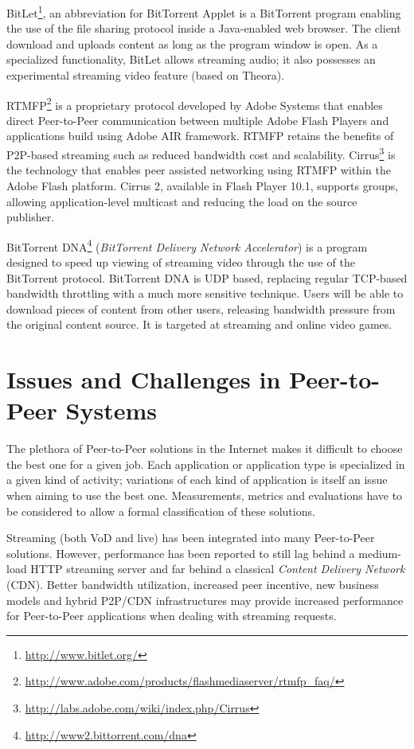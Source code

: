BitLet\footnote{\url{http://www.bitlet.org/}}, an abbreviation for BitTorrent Applet
is a BitTorrent program enabling the use of the file sharing protocol inside a
Java-enabled web browser. The client download and uploads content as long as
the program window is open. As a specialized functionality, BitLet allows
streaming audio; it also possesses an experimental streaming video feature
(based on Theora).

RTMFP\footnote{\url{http://www.adobe.com/products/flashmediaserver/rtmfp_faq/}} is a
proprietary protocol developed by Adobe Systems that enables direct
Peer-to-Peer communication between multiple Adobe Flash Players and
applications build using Adobe AIR framework. RTMFP retains the benefits of
P2P-based streaming such as reduced bandwidth cost and scalability.
Cirrus\footnote{\url{http://labs.adobe.com/wiki/index.php/Cirrus}} is the technology
that enables peer assisted networking using RTMFP within the Adobe Flash
platform. Cirrus 2, available in Flash Player 10.1, supports groups, allowing
application-level multicast and reducing the load on the source publisher.

BitTorrent DNA\footnote{\url{http://www2.bittorrent.com/dna}} (\textit{BitTorrent
Delivery Network Accelerator}) is a program designed to speed up viewing of
streaming video through the use of the BitTorrent protocol. BitTorrent DNA is
UDP based, replacing regular TCP-based bandwidth throttling with a much more
sensitive technique. Users will be able to download pieces of content from
other users, releasing bandwidth pressure from the original content source. It
is targeted at streaming and online video games.

\section{Issues and Challenges in Peer-to-Peer Systems}
\label{sec:p2p-systems:issues}

The plethora of Peer-to-Peer solutions in the Internet makes it difficult to
choose the best one for a given job. Each application or application type is
specialized in a given kind of activity; variations of each kind of
application is itself an issue when aiming to use the best one. Measurements,
metrics and evaluations have to be considered to allow a formal classification
of these solutions.

Streaming (both VoD and live) has been integrated into many Peer-to-Peer
solutions.  However, performance has been reported to still lag behind a
medium-load HTTP streaming server and far behind a classical \textit{Content
Delivery Network} (CDN). Better bandwidth utilization, increased peer
incentive, new business models and hybrid P2P/CDN infrastructures may provide
increased performance for Peer-to-Peer applications when dealing with
streaming requests.

